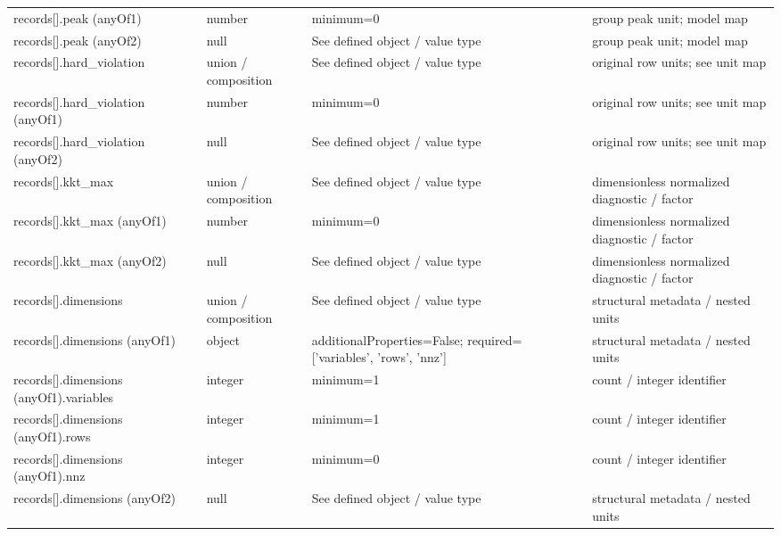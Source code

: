 \begin{longtable}{@{}>{\raggedright\arraybackslash}p{}>{\raggedright\arraybackslash}p{}>{\raggedright\arraybackslash}p{}>{\raggedright\arraybackslash}p{}@{}}
records[].\allowbreak{}peak (anyOf1) & number & minimum=\allowbreak{}0 & group peak unit; model map\\
records[].\allowbreak{}peak (anyOf2) & null & See defined object /\allowbreak{} value type & group peak unit; model map\\
records[].\allowbreak{}hard\_\allowbreak{}violation & union /\allowbreak{} composition & See defined object /\allowbreak{} value type & original row units; see unit map\\
records[].\allowbreak{}hard\_\allowbreak{}violation (anyOf1) & number & minimum=\allowbreak{}0 & original row units; see unit map\\
records[].\allowbreak{}hard\_\allowbreak{}violation (anyOf2) & null & See defined object /\allowbreak{} value type & original row units; see unit map\\
records[].\allowbreak{}kkt\_\allowbreak{}max & union /\allowbreak{} composition & See defined object /\allowbreak{} value type & dimensionless normalized diagnostic /\allowbreak{} factor\\
records[].\allowbreak{}kkt\_\allowbreak{}max (anyOf1) & number & minimum=\allowbreak{}0 & dimensionless normalized diagnostic /\allowbreak{} factor\\
records[].\allowbreak{}kkt\_\allowbreak{}max (anyOf2) & null & See defined object /\allowbreak{} value type & dimensionless normalized diagnostic /\allowbreak{} factor\\
records[].\allowbreak{}dimensions & union /\allowbreak{} composition & See defined object /\allowbreak{} value type & structural metadata /\allowbreak{} nested units\\
records[].\allowbreak{}dimensions (anyOf1) & object & additionalProperties=\allowbreak{}False; required=\allowbreak{}['variables', 'rows', 'nnz'] & structural metadata /\allowbreak{} nested units\\
records[].\allowbreak{}dimensions (anyOf1).\allowbreak{}variables & integer & minimum=\allowbreak{}1 & count /\allowbreak{} integer identifier\\
records[].\allowbreak{}dimensions (anyOf1).\allowbreak{}rows & integer & minimum=\allowbreak{}1 & count /\allowbreak{} integer identifier\\
records[].\allowbreak{}dimensions (anyOf1).\allowbreak{}nnz & integer & minimum=\allowbreak{}0 & count /\allowbreak{} integer identifier\\
records[].\allowbreak{}dimensions (anyOf2) & null & See defined object /\allowbreak{} value type & structural metadata /\allowbreak{} nested units\\

\end{longtable}
